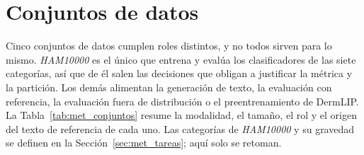 \section{Conjuntos de datos}
\label{sec:met_datasets}

Cinco conjuntos de datos cumplen roles distintos, y no todos sirven para lo mismo. \emph{HAM10000} es el único que
entrena y evalúa los clasificadores de las siete categorías, así que de él salen las decisiones que obligan a
justificar la métrica y la partición. Los demás alimentan la generación de texto, la evaluación con referencia, la
evaluación fuera de distribución o el preentrenamiento de DermLIP. La Tabla~\ref{tab:met_conjuntos} resume la
modalidad, el tamaño, el rol y el origen del texto de referencia de cada uno. Las categorías de \emph{HAM10000} y su
gravedad se definen en la Sección~\ref{sec:met_tareas}; aquí solo se retoman.

